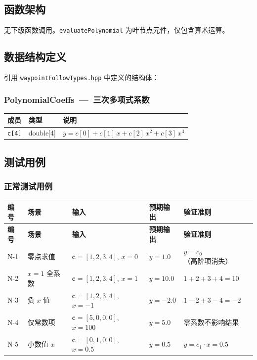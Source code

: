 \documentclass[a4paper,10pt]{article}
\begin{document}
\subsection{函数架构}

无下级函数调用。\texttt{evaluatePolynomial} 为叶节点元件，仅包含算术运算。

\subsection{数据结构定义}

引用 \texttt{waypointFollowTypes.hpp} 中定义的结构体：

\subsubsection{PolynomialCoeffs~---~三次多项式系数}
\begin{longtable}{|L{3.5cm}|C{2cm}|L{9.5cm}|}
\hline
\textbf{成员} & \textbf{类型} & \textbf{说明} \\
\hline
\texttt{c[4]} & double[4] & $y = c[0] + c[1]\,x + c[2]\,x^2 + c[3]\,x^3$ \\
\hline
\end{longtable}

\subsection{测试用例}

\subsubsection{正常测试用例}

{\small
\begin{longtable}{|C{0.6cm}|L{2.2cm}|L{4.5cm}|L{3.5cm}|L{3.8cm}|}
\hline
\textbf{编号} & \textbf{场景} & \textbf{输入} & \textbf{预期输出} & \textbf{验证准则} \\
\hline
\endfirsthead
\hline
\textbf{编号} & \textbf{场景} & \textbf{输入} & \textbf{预期输出} & \textbf{验证准则} \\
\hline
\endhead
N-1 &
零点求值 &
$\mathbf{c}{=}[1,2,3,4]$, $x{=}0$ &
$y = 1.0$ &
$y = c_0$（高阶项消失） \\
\hline
N-2 &
$x{=}1$ 全系数 &
$\mathbf{c}{=}[1,2,3,4]$, $x{=}1$ &
$y = 10.0$ &
$1{+}2{+}3{+}4 = 10$ \\
\hline
N-3 &
负 $x$ 值 &
$\mathbf{c}{=}[1,2,3,4]$, $x{=}{-}1$ &
$y = -2.0$ &
$1{-}2{+}3{-}4 = -2$ \\
\hline
N-4 &
仅常数项 &
$\mathbf{c}{=}[5,0,0,0]$, $x{=}100$ &
$y = 5.0$ &
零系数不影响结果 \\
\hline
N-5 &
小数值 $x$ &
$\mathbf{c}{=}[0,1,0,0]$, $x{=}0.5$ &
$y = 0.5$ &
$y = c_1 \cdot x = 0.5$ \\
\hline
\end{longtable}
}
\end{document}
